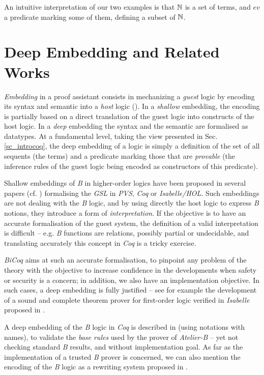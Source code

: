 \documentclass{llncs}
\begin{document}
An intuitive interpretation of our two examples is that $\mathbb{N}$ is a set of terms, and $ev$ a 
predicate marking some of them, defining a subset of $\mathbb{N}$.

\section{Deep Embedding and Related Works}\label{sc_relworks}

\emph{Embedding} in a proof assistant consists in mechanizing a \emph{guest} logic by encoding 
its syntax and semantic into a \emph{host} logic (\cite{gor:2,bou:1,azu:1}). In a 
\emph{shallow} embedding, the encoding is partially based on a direct translation of the guest 
logic into constructs of the host logic. In a \emph{deep} embedding the syntax and the 
semantic are formalised as datatypes. At a fundamental level, taking the view presented in 
Sec. \ref{sc_introcoq}, the deep embedding of a logic is simply a definition of the set of all 
sequents (the terms) and a predicate marking those that are \emph{provable} (the inference 
rules of the guest logic being encoded as constructors of this predicate).

Shallow embeddings of \emph{B} in higher-order logics have been proposed in several papers
(cf. \cite{bod:1b,cha:1}) formalising the \emph{GSL} in \emph{PVS}, \emph{Coq} or
\emph{Isabelle/HOL}. Such embeddings are not dealing with the \emph{B} logic, and by using 
directly the host logic to express \emph{B} notions, they introduce a form of 
\emph{interpretation}. If the objective is to have an accurate formalisation of the guest 
system, the definition of a valid interpretation is difficult -- e.g. \emph{B} functions are 
relations, possibly partial or undecidable, and translating accurately this concept in 
\emph{Coq} is a tricky exercise.

\emph{BiCoq} aims at such an accurate formalisation, to pinpoint any problem of the theory 
with the objective to increase confidence in the developments when safety or security is a 
concern; in addition, we also have an implementation objective. In such cases, a deep 
embedding is fully justified -- see for example the development of a sound and complete 
theorem prover for first-order logic verified in \emph{Isabelle} proposed in \cite{rid:1}.

A deep embedding of the \emph{B} logic in \emph{Coq} is described in \cite{brk:1} (using
notations with names), to validate the \emph{base rules} used by the prover of 
\emph{Atelier-B} -- yet not checking standard \emph{B} results, and without implementation 
goal. As far as the implementation of a trusted \emph{B} prover is concerned, we can also 
mention the encoding of the \emph{B} logic as a rewriting system proposed in \cite{cir:1}.
\end{document}
